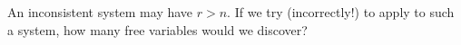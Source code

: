 An inconsistent system may have $r>n$.  If we try (incorrectly!) to apply  to such a system, how many free variables would we discover?